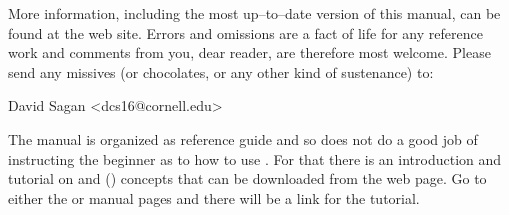 More information, including the most up--to--date version of this manual, can be found at
the \bmad web site\cite{b:bmad.web}.  Errors and omissions are a fact of life for any
reference work and comments from you, dear reader, are therefore most welcome. Please send
any missives (or chocolates, or any other kind of sustenance) to:
\begin{example}
  David Sagan <dcs16@cornell.edu>
\end{example}

The \bmad manual is organized as reference guide and so does not do a good job of instructing the
beginner as to how to use \bmad. For that there is an introduction and tutorial on \bmad and \tao
() concepts that can be downloaded from the \bmad web page. Go to either the \bmad or
\tao manual pages and there will be a link for the tutorial.

